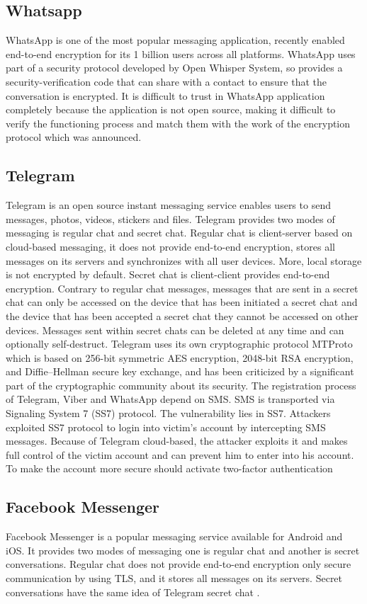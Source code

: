 \subsection{Whatsapp}
WhatsApp is one of the most popular messaging application, recently enabled end-to-end encryption for its 1 billion users across all platforms. WhatsApp uses part of a security protocol developed by Open Whisper System, so provides a security-verification code that can share with a contact to ensure that the conversation is encrypted. It is difficult to trust in WhatsApp application completely because the application is not open source, making it difficult to verify the functioning process and match them with the work of the encryption protocol which was announced.

\subsection{Telegram}
Telegram is an open source instant messaging service enables users to send messages, photos, videos, stickers and files. Telegram provides two modes of messaging
is regular chat and secret chat. Regular chat is client-server based on cloud-based messaging, it does not provide end-to-end encryption, stores all messages on its
servers and synchronizes with all user devices. More, local storage is not encrypted by default. Secret chat is client-client provides end-to-end encryption. Contrary to regular chat messages, messages that are sent in a secret chat can only be accessed on the device that has been initiated a secret chat and the device that has been accepted a secret chat they cannot be accessed on other devices. Messages sent within secret chats can be deleted
at any time and can optionally self-destruct. Telegram uses its own cryptographic protocol MTProto which is based on 256-bit symmetric AES encryption, 2048-bit RSA encryption, and Diffie–Hellman secure key exchange, and has been criticized by a significant part of the cryptographic community about its security. The registration process of Telegram, Viber and WhatsApp depend on SMS. SMS is transported via Signaling System 7 (SS7) protocol. The vulnerability lies in SS7. Attackers exploited SS7 protocol to login into
victim's account by intercepting SMS messages. Because of Telegram cloud-based, the attacker exploits it and makes full control of the victim account and can prevent him to enter into his account. To make the account more secure should activate two-factor authentication \cite{de}

\subsection{Facebook Messenger}
Facebook Messenger is a popular messaging service
available for Android and iOS. It provides two modes of
messaging one is regular chat and another is secret conversations.
Regular chat does not provide end-to-end encryption only
secure communication by using TLS,  and it stores all
messages on its servers. Secret conversations have  the
same idea of Telegram secret chat .




